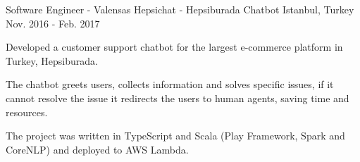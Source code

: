 \begin{cventries}
  \cventry
    {Software Engineer - Valensas}
    {Hepsichat - Hepsiburada Chatbot}
    {Istanbul, Turkey}
    {Nov. 2016 - Feb. 2017}
    {
      \begin{cvitems}
        \item {Developed a customer support chatbot for the largest e-commerce platform in Turkey, Hepsiburada.}
        \item {The chatbot greets users, collects information and solves specific issues, if it cannot resolve the issue it redirects the users to human agents, saving time and resources.}
        \item {The project was written in TypeScript and Scala (Play Framework, Spark and CoreNLP) and deployed to AWS Lambda.}
      \end{cvitems}
    }

    
\end{cventries}

